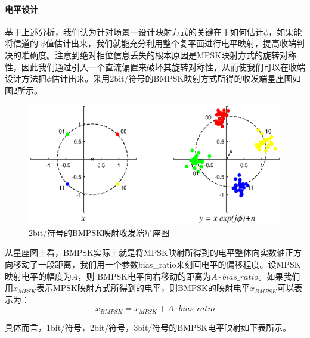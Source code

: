 \paragraph{电平设计}
\indent

基于上述分析，我们认为针对场景一设计映射方式的关键在于如何估计$\phi$，如果能将信道的 $\phi$值估计出来，我们就能充分利用整个复平面进行电平映射，提高收端判决的准确度。注意到绝对相位信息丢失的根本原因是MPSK映射方式的旋转对称性，因此我们通过引入一个直流偏置来破坏其旋转对称性，从而使我们可以在收端设计方法把$\phi$估计出来。采用2bit/符号的BMPSK映射方式所得的收发端星座图如图2所示。

\begin{figure}[h]
    \centering
    \includegraphics[width=\textwidth]{pic/1-1-2.eps}
    \caption{2bit/符号的BMPSK映射收发端星座图}
\end{figure}

从星座图上看，BMPSK实际上就是将MPSK映射所得到的电平整体向实数轴正方向移动了一段距离，我们用一个参数bias\_ratio来刻画电平的偏移程度。设MPSK映射电平的幅度为$A$，则 BMPSK电平向右移动的距离为$A\cdot bias\_ratio$。如果我们用$x_{MPSK}$表示MPSK映射方式所得到的电平，则BMPSK的映射电平$x_{BMPSK}$可以表示为：
$$x_{BMPSK}=x_{MPSK}+A\cdot bias\_ratio$$

具体而言，1bit/符号，2bit/符号，3bit/符号的BMPSK电平映射如下表所示。

